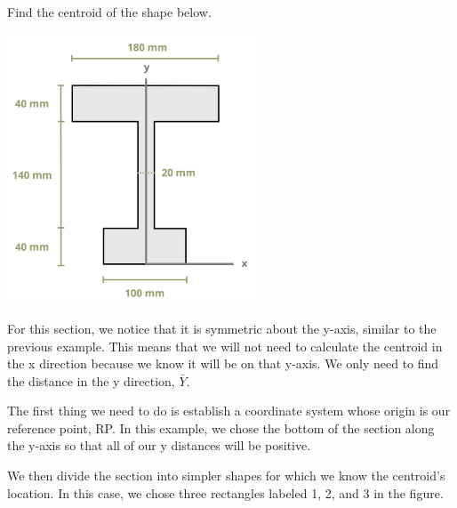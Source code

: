 \documentclass[
  letterpaper,
  DIV=11,
  numbers=noendperiod]{scrreprt}
\theoremstyle{definition}
\theoremstyle{remark}
\begin{document}
\begin{tcolorbox}[enhanced jigsaw, leftrule=.75mm, colbacktitle=quarto-callout-tip-color!10!white, breakable, opacityback=0, colback=white, titlerule=0mm, toprule=.15mm, colframe=quarto-callout-tip-color-frame, coltitle=black, title={Example 8.2}, toptitle=1mm, bottomrule=.15mm, rightrule=.15mm, left=2mm, arc=.35mm, opacitybacktitle=0.6, bottomtitle=1mm]

Find the centroid of the shape below.

\begin{center}
\includegraphics[width=2.91667in,height=\textheight]{images/CH 8 PNGs/example 8.2 part 1.png}
\end{center}

\begin{tcolorbox}[enhanced jigsaw, leftrule=.75mm, colbacktitle=quarto-callout-tip-color!10!white, breakable, opacityback=0, colback=white, titlerule=0mm, toprule=.15mm, colframe=quarto-callout-tip-color-frame, coltitle=black, title={Solution}, toptitle=1mm, bottomrule=.15mm, rightrule=.15mm, left=2mm, arc=.35mm, opacitybacktitle=0.6, bottomtitle=1mm]

For this section, we notice that it is symmetric about the y-axis,
similar to the previous example. This means that we will not need to
calculate the centroid in the x direction because we know it will be on
that y-axis. We only need to find the distance in the y direction,
\(\bar{Y}\).

The first thing we need to do is establish a coordinate system whose
origin is our reference point, RP. In this example, we chose the bottom
of the section along the y-axis so that all of our y distances will be
positive.

We then divide the section into simpler shapes for which we know the
centroid's location. In this case, we chose three rectangles labeled 1,
2, and 3 in the figure.


\end{tcolorbox}
\end{tcolorbox}
\end{document}
